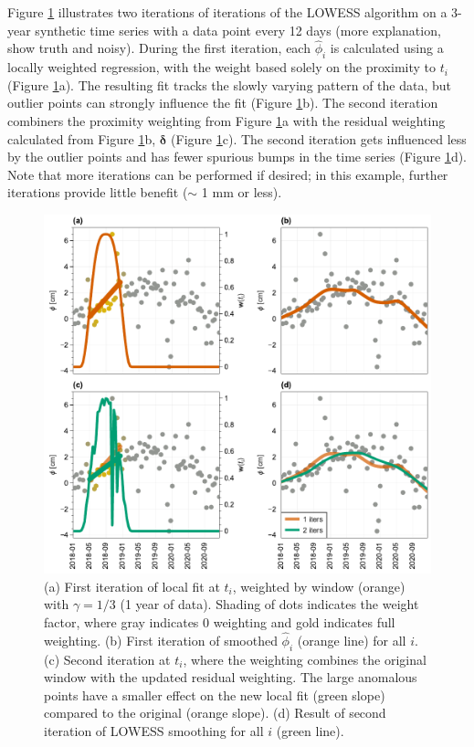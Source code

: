 Figure \ref{fig:ch5-algo-demo} illustrates two iterations of iterations of the LOWESS algorithm on a 3-year synthetic time series with a data point every 12 days (more explanation, show truth and noisy). 
During the first iteration, each $ \hat{\phi}_i $ is calculated using a locally weighted regression, with the weight based solely on the proximity to $ t_i $ (Figure \ref{fig:ch5-algo-demo}a). The resulting fit tracks the slowly varying pattern of the data, but outlier points can strongly influence the fit (Figure \ref{fig:ch5-algo-demo}b). 
The second iteration combiners the proximity weighting from Figure \ref{fig:ch5-algo-demo}a with the residual weighting calculated from Figure \ref{fig:ch5-algo-demo}b, $ \bm{\delta} $ (Figure \ref{fig:ch5-algo-demo}c).
The second iteration gets influenced less by the outlier points and has fewer spurious bumps in the time series (Figure \ref{fig:ch5-algo-demo}d). Note that more iterations can be performed if desired; in this example, further iterations provide little benefit ($ \sim $ 1 mm or less).


\begin{figure}[!h]
	\centering
	\includegraphics[width=.99\textwidth]{figures/chapter5-lowess/figure2-fits.pdf}
	\caption[Demo of LOWESS fitting]{
		(a) First iteration of local fit at $t_i$, weighted by window (orange) with $ \gamma=1/3 $ (1 year of data). Shading of dots indicates the weight factor, where gray indicates 0 weighting and gold indicates full weighting.
		(b) First iteration of smoothed $ \hat{\phi}_i $ (orange line) for all $i$. 
		(c) Second iteration at $t_i$, where the weighting combines the original window with the updated residual weighting. The large anomalous points have a smaller effect on the new local fit (green slope) compared to the original (orange slope).
		(d) Result of second iteration of LOWESS smoothing for all $i$ (green line).
	}
	\label{fig:ch5-algo-demo}
\end{figure}



